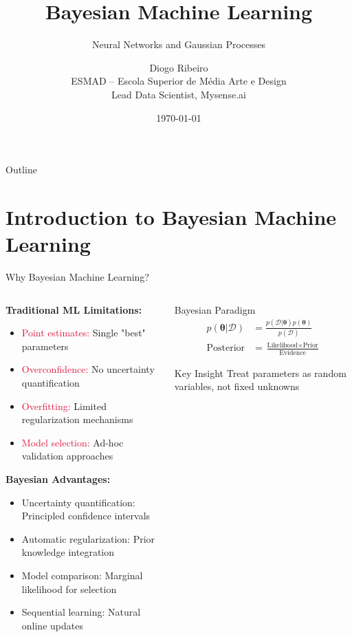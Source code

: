 \documentclass[aspectratio=169,11pt]{beamer}
\title[Bayesian ML]{Bayesian Machine Learning}
\subtitle{Neural Networks and Gaussian Processes}
\author[D. Ribeiro]{Diogo Ribeiro\\
\small ESMAD -- Escola Superior de Média Arte e Design\\
\small Lead Data Scientist, Mysense.ai}
\date{\today}
\newcommand{\btheta}{\boldsymbol{\theta}}
\begin{document}
\begin{frame}
\titlepage
\end{frame}

\begin{frame}{Outline}
\tableofcontents
\end{frame}

\section{Introduction to Bayesian Machine Learning}

\begin{frame}{Why Bayesian Machine Learning?}
\begin{columns}
\begin{column}{0.6\textwidth}
\textbf{Traditional ML Limitations:}
\begin{itemize}
\item \textcolor{crimson}{Point estimates:} Single "best" parameters
\item \textcolor{crimson}{Overconfidence:} No uncertainty quantification
\item \textcolor{crimson}{Overfitting:} Limited regularization mechanisms
\item \textcolor{crimson}{Model selection:} Ad-hoc validation approaches
\end{itemize}

\vspace{0.5cm}
\textbf{Bayesian Advantages:}
\begin{itemize}
\item \textcolor{forest}{Uncertainty quantification:} Principled confidence intervals
\item \textcolor{forest}{Automatic regularization:} Prior knowledge integration
\item \textcolor{forest}{Model comparison:} Marginal likelihood for selection
\item \textcolor{forest}{Sequential learning:} Natural online updates
\end{itemize}
\end{column}
\begin{column}{0.4\textwidth}
\begin{block}{Bayesian Paradigm}
\begin{align}
p(\btheta|\mathcal{D}) &= \frac{p(\mathcal{D}|\btheta)p(\btheta)}{p(\mathcal{D})}\\[0.3cm]
\text{Posterior} &= \frac{\text{Likelihood} \times \text{Prior}}{\text{Evidence}}
\end{align}
\end{block}

\begin{alertblock}{Key Insight}
Treat parameters as random variables, not fixed unknowns
\end{alertblock}
\end{column}
\end{columns}
\end{frame}
\end{document}
